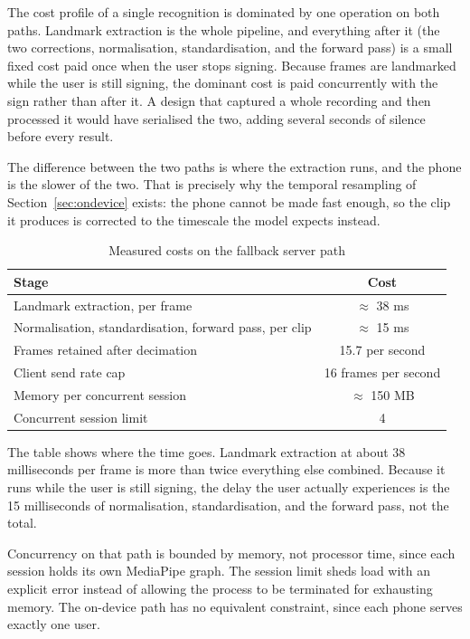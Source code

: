 The cost profile of a single recognition is dominated by one operation on both paths. Landmark extraction is the whole pipeline, and everything after it (the two corrections, normalisation, standardisation, and the forward pass) is a small fixed cost paid once when the user stops signing. Because frames are landmarked while the user is still signing, the dominant cost is paid concurrently with the sign rather than after it. A design that captured a whole recording and then processed it would have serialised the two, adding several seconds of silence before every result.

The difference between the two paths is where the extraction runs, and the phone is the slower of the two. That is precisely why the temporal resampling of Section~\ref{sec:ondevice} exists: the phone cannot be made fast enough, so the clip it produces is corrected to the timescale the model expects instead.

\begin{table}[htbp]
    \centering
    \caption{Measured costs on the fallback server path}
    \label{tab:latency}
    \begin{tabular}{lc}
        \toprule
        \textbf{Stage} & \textbf{Cost} \\
        \midrule
        Landmark extraction, per frame & $\approx$ 38 ms \\
        Normalisation, standardisation, forward pass, per clip & $\approx$ 15 ms \\
        Frames retained after decimation & 15.7 per second \\
        Client send rate cap & 16 frames per second \\
        Memory per concurrent session & $\approx$ 150 MB \\
        Concurrent session limit & 4 \\
        \bottomrule
    \end{tabular}
\end{table}

\noindent The table shows where the time goes. Landmark extraction at about 38 milliseconds per frame is more than twice everything else combined. Because it runs while the user is still signing, the delay the user actually experiences is the 15 milliseconds of normalisation, standardisation, and the forward pass, not the total.

\noindent Concurrency on that path is bounded by memory, not processor time, since each session holds its own MediaPipe graph. The session limit sheds load with an explicit error instead of allowing the process to be terminated for exhausting memory. The on-device path has no equivalent constraint, since each phone serves exactly one user.

